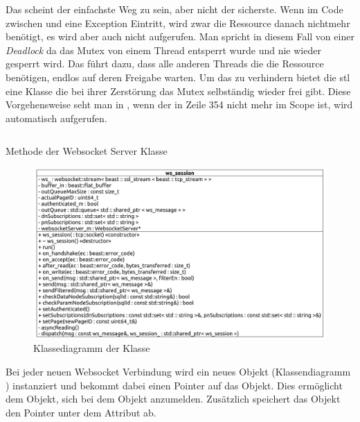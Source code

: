 Das scheint der einfachste Weg zu sein, aber nicht der sicherste. 
Wenn im Code zwischen  und  eine Exception Eintritt, 
wird zwar die Ressource danach nichtmehr benötigt, es wird aber auch nicht  aufgerufen.
Man spricht in diesem Fall von einer \emph{Deadlock} da das Mutex von einem Thread entsperrt wurde und nie wieder gesperrt wird. 
Das führt dazu, dass alle anderen Threads die die Ressource benötigen, endlos auf deren Freigabe warten. 
Um das zu verhindern bietet die \ac{stl} eine  Klasse die bei ihrer Zerstörung das Mutex selbständig wieder frei gibt.
Diese Vorgehensweise seht man in , wenn der  in Zeile 354 nicht mehr im Scope ist, wird automatisch  aufgerufen.
\begin{listing}[ht]
  \inputminted[linenos=true,breaklines=true, firstline=348, lastline=354]{c++}{../Backend/WebsocketServer.cpp}
  \caption{Methode  der Websocket Server Klasse}
  \label{list:addSession}
\end{listing}
\begin{figure}[ht]
  \centering
  \includegraphics[width=\textwidth]{content/hauptteil/umsetzungPoC/backend/uml/classesOfOverview/ws_session.pdf}
  \caption{Klassediagramm der Klasse }
  \label{fig:backend:classDiag:wsSession}
\end{figure}
Bei jeder neuen Websocket Verbindung wird ein neues  Objekt (Klassendiagramm ) instanziert 
und bekommt dabei einen Pointer auf das  Objekt. Dies ermöglicht dem  Objekt, 
sich bei dem  Objekt anzumelden. 
Zusätzlich speichert das  Objekt den Pointer unter dem Attribut  ab.
